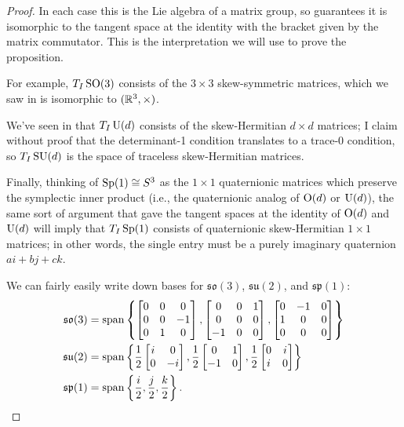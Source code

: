 \begin{proof}
	In each case this is the Lie algebra of a matrix group, so  guarantees it is isomorphic to the tangent space at the identity with the bracket given by the matrix commutator. This is the interpretation we will use to prove the proposition.
	
	For example, $T_I\operatorname{SO}(3)$ consists of the $3 \times 3$ skew-symmetric matrices, which we saw in  is isomorphic to $(\mathbb{R}^3,\times)$.
	
	We've seen in  that $T_I\operatorname{U}(d)$ consists of the skew-Hermitian $d \times d$ matrices; I claim without proof that the determinant-1 condition translates to a trace-0 condition, so $T_I\operatorname{SU}(d)$ is the space of traceless skew-Hermitian matrices.
	
	Finally, thinking of $\operatorname{Sp}(1) \cong S^3$ as the $1 \times 1$ quaternionic matrices which preserve the symplectic inner product (i.e., the quaternionic analog of $\operatorname{O}(d)$ or $\operatorname{U}(d)$), the same sort of argument that gave the tangent spaces at the identity of $\operatorname{O}(d)$ and $\operatorname{U}(d)$ will imply that $T_I \operatorname{Sp}(1)$ consists of quaternionic skew-Hermitian $1 \times 1$ matrices; in other words, the single entry must be a purely imaginary quaternion $ai + bj + ck$.
	
	We can fairly easily write down bases for $\mathfrak{so}(3)$, $\mathfrak{su}(2)$, and $\mathfrak{sp}(1)$:
	\begin{align*}
		\mathfrak{so}(3) & = \operatorname{span} \left\{ \begin{bmatrix} 0 & 0 & 0 \\ 0 & 0 & -1\\ 0 & 1 & 0 \end{bmatrix}, \begin{bmatrix} 0 & 0 & 1 \\ 0 & 0 & 0\\ -1 & 0 & 0 \end{bmatrix}, \begin{bmatrix} 0 & -1 & 0 \\ 1 & 0 & 0\\ 0 & 0 & 0 \end{bmatrix} \right\} \\
		\mathfrak{su}(2) & = \operatorname{span} \left\{ \frac{1}{2} \begin{bmatrix} i & 0 \\ 0 & -i \end{bmatrix}, \frac{1}{2} \begin{bmatrix} 0 & 1 \\ -1 & 0 \end{bmatrix} , \frac{1}{2} \begin{bmatrix} 0 & i \\ i & 0 \end{bmatrix}   \right\} \\
		\mathfrak{sp}(1) & = \operatorname{span} \left\{ \frac{i}{2}, \frac{j}{2}, \frac{k}{2} \right\}.
	\end{align*}
	

\end{proof}
